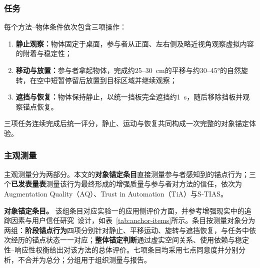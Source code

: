 \documentclass[review]{vgtc}
\begin{document}
\subsubsection{任务}

每个方法--物体条件依次包含三项操作：
\begin{enumerate}[leftmargin=1.8em,label=(\arabic*),itemsep=1pt,topsep=2pt]
  \item \textbf{静止观察：}物体固定于桌面，参与者从正面、左右侧及略近视角观察虚拟内容的附着与稳定性；
  \item \textbf{移动与放置：}参与者拿起物体，完成约25--30~cm的平移与约30--45°的自然旋转，在空中短暂停留后放置到目标区域并继续观察；
  \item \textbf{遮挡与恢复：}物体保持静止，以统一挡板完全遮挡约1~s，随后移除挡板并观察锚点恢复。
\end{enumerate}

三项任务连续完成后统一评分，静止、运动与恢复共同构成一次完整的对象锚定体验。

\subsubsection{主观测量}

主观测量分为两部分。本文的\textbf{对象锚定条目}直接测量参与者感知到的锚点行为；三个\textbf{已发表量表}测量该行为最终形成的增强质量与参与者对方法的信任，依次为Augmentation Quality（AQ）、Trust in Automation（TiA）与S-TIAS。

\textbf{对象锚定条目。}
该组条目对应实验一的应用侧评价方面，并参考增强现实中的追踪因素与用户信任研究~\cite{trustar2024}设计，如表~\ref{tab:anchor-items}所示。条目按测量对象分为两组：\textbf{阶段锚点行为}四项分别针对静止、平移运动、旋转与遮挡恢复，与任务中依次经历的锚点状态一一对应；\textbf{整体锚定判断}通过虚实空间关系、使用依赖与稳定性--响应性权衡给出对该方法的总体评价。七项条目均采用七点同意度并分别分析，不合并为总分；分组用于组织测量与报告。
\end{document}
